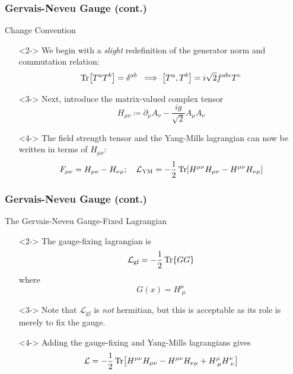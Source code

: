 \documentclass{beamer}
\begin{document}
\begin{frame}
    \frametitle{Gervais-Neveu Gauge (cont.)}
    \alert{Change Convention}
    \begin{itemize}
        \item[\textbullet]<2-> We begin with a \textit{slight} redefinition of the generator norm and commutation relation: \[ \Tr[T^aT^b] = \delta^{ab} \; \implies \comm{T^a}{T^b} = i\sqrt{2}f^{abc}T^c \]
        \item[\textbullet]<3-> Next, introduce the matrix-valued complex tensor \[ H_{\mu\nu} \coloneqq \partial_\mu A_\nu - \frac{ig}{\sqrt{2}}A_\mu A_\nu \]
        \item[\textbullet]<4-> The field strength tensor and the Yang-Mills lagrangian can now be written in terms of $H_{\mu\nu}$: \[ F_{\mu\nu} = H_{\mu\nu} - H_{\nu\mu}; \quad \mathcal{L}_\text{YM} = -\frac{1}{2}\Tr[H^{\mu\nu}H_{\mu\nu} - H^{\mu\nu}H_{\nu\mu}] \] 
    \end{itemize}
\end{frame}

\begin{frame}
    \frametitle{Gervais-Neveu Gauge (cont.)}
    \alert{The Gervais-Neveu Gauge-Fixed Lagrangian}
    \begin{itemize}
        \item[\textbullet]<2-> The gauge-fixing lagrangian is \[ \mathcal{L}_\text{gf} = -\frac{1}{2}\Tr{GG} \] where \[ G(x) = H_{\;\mu}^\mu \]
        \item[\textbullet]<3-> Note that $\mathcal{L}_\text{gf}$ is \textit{not} hermitian, but this is acceptable as its role is merely to fix the gauge.
        \item[\textbullet]<4-> Adding the gauge-fixing and Yang-Mills lagrangians gives \[ \mathcal{L} = -\frac{1}{2}\Tr[H^{\mu\nu}H_{\mu\nu} - H^{\mu\nu}H_{\nu\mu} + H_{\;\mu}^\mu H_{\;\nu}^\nu] \]
    \end{itemize}
\end{frame}
\end{document}
